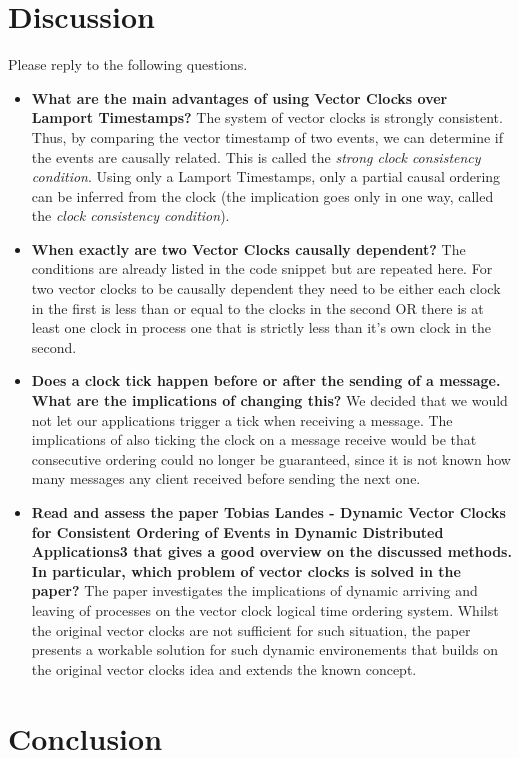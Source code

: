\documentclass{report}
\begin{document}
\section{Discussion}
Please reply to the following questions.
\begin{itemize}
  \item \textbf{What are the main advantages of using Vector Clocks over Lamport Timestamps?} The system of vector clocks is strongly consistent. Thus, by comparing the vector timestamp of two events, we can determine if the events are causally related. This is called the \textit{strong clock consistency condition}. Using only a Lamport Timestamps, only a partial causal ordering can be inferred from the clock (the implication goes only in one way, called the \textit{clock consistency condition}).
  \item \textbf{When exactly are two Vector Clocks causally dependent?} The conditions are already listed in the code snippet but are repeated here. For two vector clocks to be causally dependent they need to be either each clock in the first is less than or equal to the clocks in the second OR there is at least one clock in process one that is strictly less than it's own clock in the second.
  \item \textbf{Does a clock tick happen before or after the sending of a message. What are the implications of changing this?} We decided that we would not let our applications trigger a tick when receiving a message. The implications of also ticking the clock on a message receive would be that consecutive ordering could no longer be guaranteed, since it is not known how many messages any client received before sending the next one.
  \item \textbf{Read and assess the paper Tobias Landes - Dynamic Vector Clocks for Consistent Ordering of Events in Dynamic Distributed Applications3 that gives a good overview on the discussed methods. In particular, which problem of vector clocks is solved in the paper?} The paper investigates the implications of dynamic arriving and leaving of processes on the vector clock logical time ordering system. Whilst the original vector clocks are not sufficient for such situation, the paper presents a workable solution for such dynamic environements that builds on the original vector clocks idea and extends the known concept.
\end{itemize}


\section{Conclusion}
\end{document}
